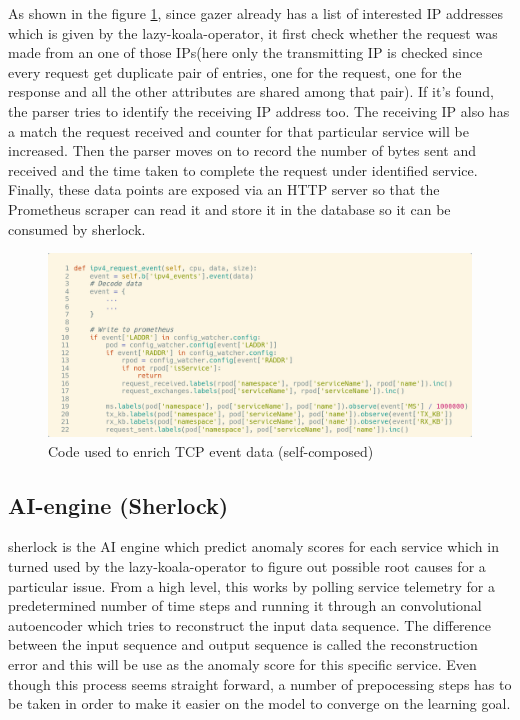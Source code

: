 As shown in the figure \ref{fig:gazer-enrich}, since \ac{gazer} already has a list of interested IP addresses which is given by the \ac{lazy-koala-operator}, it first check whether the request was made from an one of those IPs(here only the transmitting IP is checked since every request get duplicate pair of entries, one for the request, one for the response and all the other attributes are shared among that pair). If it's found, the parser tries to identify the receiving IP address too. The receiving IP also has a match the request received and counter for that particular service will be increased. Then the parser moves on to record the number of bytes sent and received and the time taken to complete the request under identified service. Finally, these data points are exposed via an HTTP server so that the Prometheus scraper can read it and store it in the database so it can be consumed by \ac{sherlock}.

\begin{figure}[H]
    \includegraphics[width=14cm]{assets/implementation/gazer-enrich.png}
    \caption{Code used to enrich TCP event data (self-composed)}
    \label{fig:gazer-enrich}
\end{figure}


\subsection{AI-engine (Sherlock)}

\ac{sherlock} is the AI engine which predict anomaly scores for each service which in turned used by the \ac{lazy-koala-operator} to figure out possible root causes for a particular issue. From a high level, this works by polling service telemetry for a predetermined number of time steps and running it through an convolutional autoencoder which tries to reconstruct the input data sequence. The difference between the input sequence and output sequence is called the reconstruction error and this will be use as the anomaly score for this specific service. Even though this process seems straight forward, a number of prepocessing steps has to be taken in order to make it easier on the model to converge on the learning goal.

